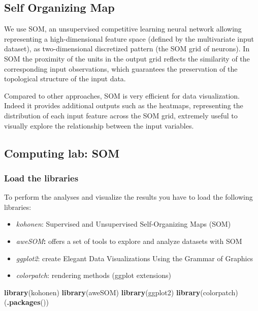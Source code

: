 \documentclass[
]{article}
\newenvironment{Shaded}{\begin{snugshade}}{\end{snugshade}}
\newcommand{\FunctionTok}[1]{\textcolor[rgb]{0.13,0.29,0.53}{\textbf{#1}}}
\newcommand{\NormalTok}[1]{#1}
\providecommand{\tightlist}{%
  \setlength{\itemsep}{0pt}\setlength{\parskip}{0pt}}
\begin{document}
\subsection{Self Organizing Map}\label{self-organizing-map}

We use SOM, an unsupervised competitive learning neural network allowing representing a high-dimensional feature space (defined by the multivariate input dataset), as two-dimensional discretized pattern (the SOM grid of neurons).
In SOM the proximity of the units in the output grid reflects the similarity of the corresponding input observations, which guarantees the preservation of the topological structure of the input data.

Compared to other approaches, SOM is very efficient for data visualization.
Indeed it provides additional outputs such as the heatmaps, representing the distribution of each input feature across the SOM grid, extremely useful to visually explore the relationship between the input variables.

\subsection{Computing lab: SOM}\label{computing-lab-som}

\subsubsection{Load the libraries}\label{load-the-libraries-3}

To perform the analyses and visualize the results you have to load the following libraries:

\begin{itemize}
\tightlist
\item
  \emph{kohonen}: Supervised and Unsupervised Self-Organizing Maps (SOM)
\item
  \emph{aweSOM}\textbf{:} offers a set of tools to explore and analyze datasets with SOM
\item
  \emph{ggplot2}: create Elegant Data Visualizations Using the Grammar of Graphics
\item
  \emph{colorpatch}: rendering methods (ggplot extensions)
\end{itemize}

\begin{Shaded}
\begin{Highlighting}[]
\FunctionTok{library}\NormalTok{(kohonen)}
\FunctionTok{library}\NormalTok{(aweSOM)}
\FunctionTok{library}\NormalTok{(ggplot2)}
\FunctionTok{library}\NormalTok{(colorpatch)}
\NormalTok{(}\FunctionTok{.packages}\NormalTok{())}
\end{Highlighting}
\end{Shaded}
\end{document}
